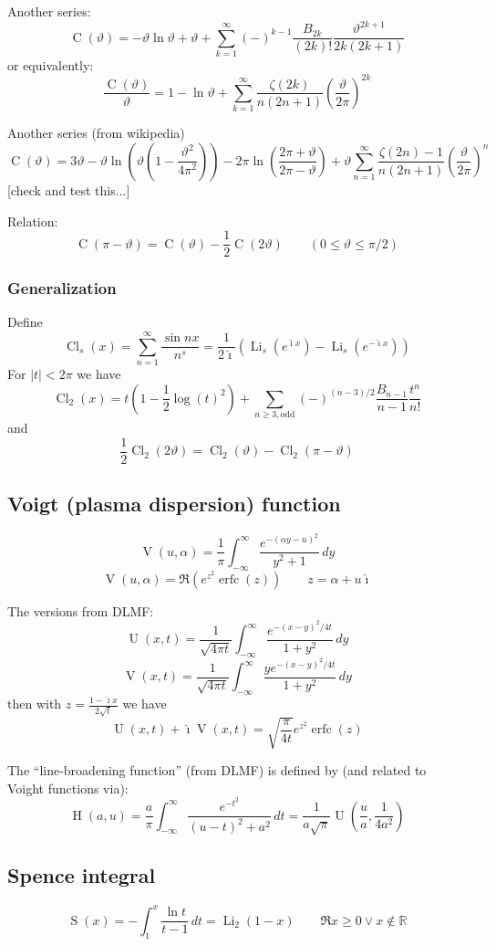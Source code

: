 \documentclass[10pt,dvipdfmx,letterpaper,twoside]{article}
\DeclareMathOperator{\erfc}{erfc}
\let\O=\operatorname
\newcommand{\RR}{{\mathbb{R}}}
\newcommand{\ii}{{\hat{\imath}}}
\let\al=\alpha
\let\theta=\vartheta
\begin{document}
Another series:
\[ \O{C}(\theta) = -\theta\ln\theta + \theta + \sum_{k=1}^\infty(-)^{k-1}\frac{B_{2k}}{(2k)!}\frac{\theta^{2k+1}}{2k(2k+1)} \]
or equivalently:
\[ \frac{\O{C}(\theta)}{\theta} = 1 - \ln\theta + \sum_{k=1}^\infty\frac{\zeta(2k)}{n(2n+1)}\left(\frac{\theta}{2\pi}\right)^{2k} \]

Another series (from wikipedia)
\[ \O{C}(\theta) = 3\theta - \theta\ln\left(\theta(1-\frac{\theta^2}{4\pi^2})\right)
    -2\pi\ln(\frac{2\pi+\theta}{2\pi-\theta}) + \theta\sum_{n=1}^\infty \frac{\zeta(2n)-1}{n(2n+1)}\left(\frac{\theta}{2\pi}\right)^{n} \]
[check and test this...]

Relation:
\[ \O{C}(\pi-\theta) = \O{C}(\theta) - \frac12\O{C}(2\theta) \qquad (0\leq\theta\leq\pi/2) \]

\subsubsection{Generalization}
Define
\[ \O{Cl}_s(x) = \sum_{n=1}^\infty \frac{\sin n x}{n^s} = \frac{1}{2\ii}\left(\O{Li}_s(e^{\ii x})-\O{Li}_s(e^{-\ii x})\right)\]
For $|t|<2\pi$ we have
\[ \O{Cl}_2(x) = t(1-\frac12\log(t)^2) + \sum_{n\geq3, \text{odd}} (-)^{(n-3)/2} \frac{B_{n-1}}{n-1} \frac{t^n}{n!} \]
and
\[ \frac12 \O{Cl}_2(2\theta) = \O{Cl}_2(\theta) - \O{Cl}_2(\pi-\theta) \]

\subsection{Voigt (plasma dispersion) function}
\[ \O{V}(u,\al) = \frac1\pi \int_{-\infty}^\infty \frac{e^{-(\al y-u)^2}}{y^2+1}\,dy \]
\[ \O{V}(u,\al) = \Re(e^{z^2}\erfc(z)) \qquad z=\al+u\ii \]

The versions from DLMF:
\[ \O{U}(x,t) = \frac{1}{\sqrt{4\pi t}} \int_{-\infty}^\infty \frac{e^{-(x-y)^2/4t}}{1 + y^2}\,dy \]
\[ \O{V}(x,t) = \frac{1}{\sqrt{4\pi t}} \int_{-\infty}^\infty \frac{y e^{-(x-y)^2/4t}}{1 + y^2}\,dy \]
then with $z=\frac{1-\ii x}{2\sqrt{t}}$ we have
\[ \O{U}(x,t) + \ii\O{V}(x,t) = \sqrt{\frac{\pi}{4t}}e^{z^2}\erfc(z) \]

The ``line-broadening function'' (from DLMF) is defined by (and related to Voight functions via):
\[ \O{H}(a,u) = \frac{a}{\pi}\int_{-\infty}^\infty\frac{e^{-t^2}}{(u-t)^2 + a^2}\,dt
    = \frac{1}{a\sqrt\pi} \O{U}(\frac{u}{a}, \frac{1}{4a^2}) \]

\subsection{Spence integral}
\[ \O{S}(x) = -\int_1^x\frac{\ln t}{t-1}\,dt = \O{Li}_2(1-x) \qquad \Re{x}\geq0 \vee x\notin\RR\]
\end{document}

